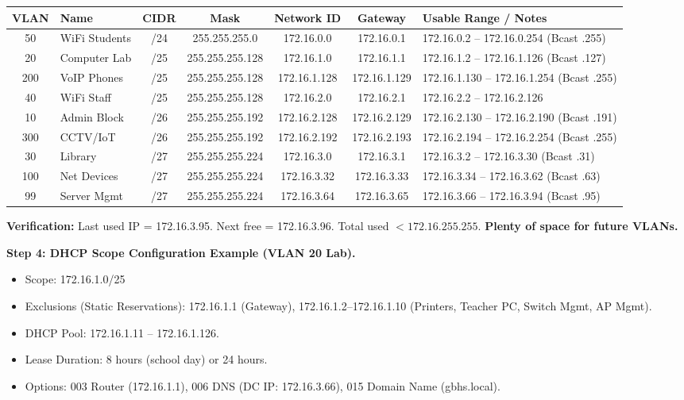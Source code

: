 \documentclass[11pt]{article}
\begin{document}
\begin{exoresolu}
\begin{center}
\begin{tabularx}{\linewidth}{|c|l|c|c|c|c|X|}
\hline
\rowcolor{popblueL}
\textbf{VLAN} & \textbf{Name} & \textbf{CIDR} & \textbf{Mask} & \textbf{Network ID} & \textbf{Gateway} & \textbf{Usable Range / Notes} \\
\hline
50 & WiFi Students & /24 & 255.255.255.0 & 172.16.0.0 & 172.16.0.1 & 172.16.0.2 -- 172.16.0.254 (Bcast .255) \\
\hline
20 & Computer Lab & /25 & 255.255.255.128 & 172.16.1.0 & 172.16.1.1 & 172.16.1.2 -- 172.16.1.126 (Bcast .127) \\
\hline
200 & VoIP Phones & /25 & 255.255.255.128 & 172.16.1.128 & 172.16.1.129 & 172.16.1.130 -- 172.16.1.254 (Bcast .255) \\
\hline
40 & WiFi Staff & /25 & 255.255.255.128 & 172.16.2.0 & 172.16.2.1 & 172.16.2.2 -- 172.16.2.126 \\
\hline
10 & Admin Block & /26 & 255.255.255.192 & 172.16.2.128 & 172.16.2.129 & 172.16.2.130 -- 172.16.2.190 (Bcast .191) \\
\hline
300 & CCTV/IoT & /26 & 255.255.255.192 & 172.16.2.192 & 172.16.2.193 & 172.16.2.194 -- 172.16.2.254 (Bcast .255) \\
\hline
30 & Library & /27 & 255.255.255.224 & 172.16.3.0 & 172.16.3.1 & 172.16.3.2 -- 172.16.3.30 (Bcast .31) \\
\hline
100 & Net Devices & /27 & 255.255.255.224 & 172.16.3.32 & 172.16.3.33 & 172.16.3.34 -- 172.16.3.62 (Bcast .63) \\
\hline
99 & Server Mgmt & /27 & 255.255.255.224 & 172.16.3.64 & 172.16.3.65 & 172.16.3.66 -- 172.16.3.94 (Bcast .95) \\
\hline
\end{tabularx}
\end{center}

\noindent\textbf{Verification:} Last used IP = 172.16.3.95. Next free = 172.16.3.96. Total used $< 172.16.255.255$. \textbf{Plenty of space for future VLANs.}

\noindent\textbf{Step 4: DHCP Scope Configuration Example (VLAN 20 Lab).}
\begin{itemize}
    \item Scope: 172.16.1.0/25
    \item Exclusions (Static Reservations): 172.16.1.1 (Gateway), 172.16.1.2--172.16.1.10 (Printers, Teacher PC, Switch Mgmt, AP Mgmt).
    \item DHCP Pool: 172.16.1.11 -- 172.16.1.126.
    \item Lease Duration: 8 hours (school day) or 24 hours.
    \item Options: 003 Router (172.16.1.1), 006 DNS (DC IP: 172.16.3.66), 015 Domain Name (gbhs.local).
\end{itemize}
\end{exoresolu}
\end{document}
